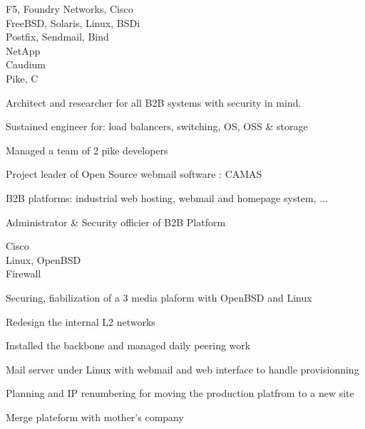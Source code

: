 \documentclass[a4paper,11pt]{cv4tw}%
\begin{document}
	{F5, Foundry Networks, Cisco\\FreeBSD, Solaris, Linux, BSDi\\Postfix, Sendmail, Bind\\NetApp\\Caudium\\Pike, C}
		{
		\begin{missions}
			\item Architect and researcher for all B2B systems with security in mind.
			\item Sustained engineer for: load balancers, switching, OS, OSS \& storage
			\item Managed a team of 2 pike developers
			\item Project leader of Open Source webmail software : CAMAS
			\item B2B platforms: industrial web hosting, webmail and homepage system, ...
			\item Administrator \& Security officier of B2B Platform
		\end{missions}
	}

	{Cisco\\Linux, OpenBSD\\Firewall}
		{
		\begin{missions}
			\item Securing, fiabilization of a 3 media plaform with OpenBSD and Linux
			\item Redesign the internal L2 networks
			\item Installed the backbone and managed daily peering work
			\item Mail server under Linux with webmail and web interface to handle provisionning
			\item Planning and IP renumbering for moving the production platfrom to a new site
			\item Merge plateform with mother's company
		\end{missions}
	}
\end{document}
